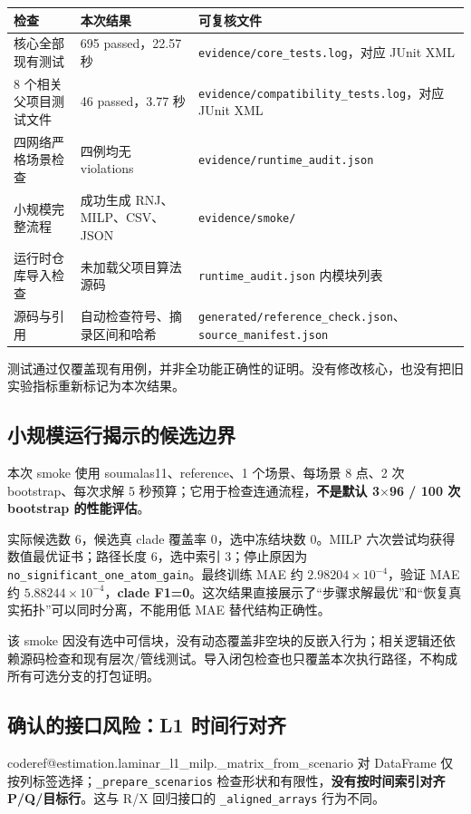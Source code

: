 \documentclass[UTF8,11pt,a4paper,fontset=windows]{ctexart}
\makeatletter
\newcommand{\CodeRef}[1]{\begingroup\small\csname coderef@#1\endcsname\endgroup}
\makeatother
\begin{document}
\begin{longtable}{P{4.5cm}P{4.1cm}P{6.3cm}}\toprule
检查 & 本次结果 & 可复核文件\\\midrule\endhead
核心全部现有测试 & 695 passed，22.57 秒 & \nolinkurl{evidence/core_tests.log}，对应 JUnit XML\\
8 个相关父项目测试文件 & 46 passed，3.77 秒 & \nolinkurl{evidence/compatibility_tests.log}，对应 JUnit XML\\
四网络严格场景检查 & 四例均无 violations & \nolinkurl{evidence/runtime_audit.json}\\
小规模完整流程 & 成功生成 RNJ、MILP、CSV、JSON & \nolinkurl{evidence/smoke/}\\
运行时仓库导入检查 & 未加载父项目算法源码 & \nolinkurl{runtime_audit.json} 内模块列表\\
源码与引用 & 自动检查符号、摘录区间和哈希 & \nolinkurl{generated/reference_check.json}、\nolinkurl{source_manifest.json}\\
\bottomrule\end{longtable}
测试通过仅覆盖现有用例，并非全功能正确性的证明。没有修改核心，也没有把旧实验指标重新标记为本次结果。

\subsection{小规模运行揭示的候选边界}
本次 smoke 使用 soumalas11、reference、1 个场景、每场景 8 点、2 次 bootstrap、每次求解 5 秒预算；它用于检查连通流程，\textbf{不是默认 3$\times$96 / 100 次 bootstrap 的性能评估}。

实际候选数 6，候选真 clade 覆盖率 0，选中冻结块数 0。MILP 六次尝试均获得数值最优证书；路径长度 6，选中索引 3；停止原因为 \nolinkurl{no_significant_one_atom_gain}。最终训练 MAE 约 $2.98204\times10^{-4}$，验证 MAE 约 $5.88244\times10^{-4}$，\textbf{clade F1=0}。这次结果直接展示了“步骤求解最优”和“恢复真实拓扑”可以同时分离，不能用低 MAE 替代结构正确性。

该 smoke 因没有选中可信块，没有动态覆盖非空块的反嵌入行为；相关逻辑还依赖源码检查和现有层次/管线测试。导入闭包检查也只覆盖本次执行路径，不构成所有可选分支的打包证明。

\subsection{确认的接口风险：L1 时间行对齐}
\CodeRef{estimation.laminar_l1_milp._matrix_from_scenario} 对 DataFrame 仅按列标签选择；\nolinkurl{_prepare_scenarios} 检查形状和有限性，\textbf{没有按时间索引对齐 P/Q/目标行}。这与 R/X 回归接口的 \nolinkurl{_aligned_arrays} 行为不同。
\end{document}
